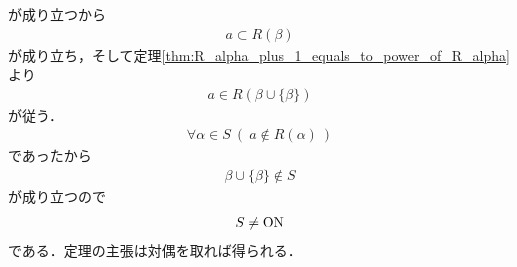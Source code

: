 \begin{prf}
		が成り立つから
		\begin{align}
			a \subset R(\beta)
		\end{align}
		が成り立ち，そして定理\ref{thm:R_alpha_plus_1_equals_to_power_of_R_alpha}より
		\begin{align}
			a \in R\left(\beta \cup \{\beta\}\right)
		\end{align}
		が従う．
		\begin{align}
			\forall \alpha \in S\ (\ a \notin R(\alpha)\ )
		\end{align}
		であったから
		\begin{align}
			\beta \cup \{\beta\} \notin S
		\end{align}
		が成り立つので
		\begin{align}
			S \neq \mathrm{ON}
		\end{align}
		である．定理の主張は対偶を取れば得られる．
		\QED
	\end{prf}